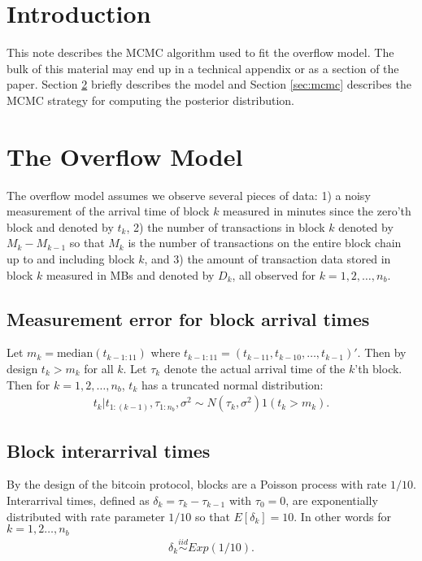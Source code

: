\documentclass{article}
\begin{document}
\section{Introduction}
This note describes the MCMC algorithm used to fit the overflow model. The bulk of this material may end up in a technical appendix or as a section of the paper. Section \ref{sec:model} briefly describes the model and Section \ref{sec:mcmc} describes the MCMC strategy for computing the posterior distribution.

\section{The Overflow Model}\label{sec:model}
The overflow model assumes we observe several pieces of data: 1) a noisy measurement of the arrival time of block $k$ measured in minutes since the zero'th block and denoted by $t_k$, 2) the number of transactions in block $k$ denoted by $M_k - M_{k-1}$ so that $M_k$ is the number of transactions on the entire block chain up to and including block $k$, and 3) the amount of transaction data stored in block $k$ measured in MBs and denoted by $D_k$, all observed for $k=1,2,\dots,n_{b}$.

\subsection{Measurement error for block arrival times}
Let $m_k = \mathrm{median}(t_{k - 1:11})$ where $t_{k-1:11} = (t_{k-11}, t_{k-10},\dots,t_{k-1})'$. Then by design $t_k > m_k$ for all $k$. Let $\tau_k$ denote the actual arrival time of the $k$'th block. Then for $k=1,2,\dots,n_{b}$, $t_k$ has a truncated normal distribution:
\begin{align*}
t_k |t_{1:(k-1)}, \tau_{1:n_{b}},\sigma^2 \sim N(\tau_k, \sigma^2)1(t_k > m_k).
\end{align*}

\subsection{Block interarrival times}
By the design of the bitcoin protocol, blocks are a Poisson process with rate $1/10$. Interarrival times, defined as $\delta_k = \tau_k - \tau_{k-1}$ with $\tau_0 = 0$, are exponentially distributed with rate parameter $1/10$ so that $E[\delta_k] = 10$. In other words for $k=1,2\dots,n_{b}$
\begin{align*}
\delta_k \stackrel{iid}{\sim} Exp(1/10).
\end{align*}
\end{document}
